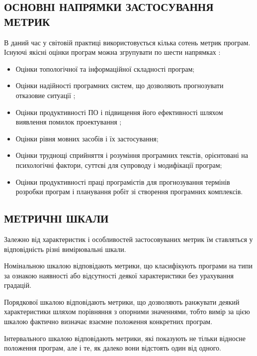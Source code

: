 \subsection{ОСНОВНІ НАПРЯМКИ ЗАСТОСУВАННЯ МЕТРИК}
\label{2section:id4}
В даний час у світовій практиці використовується кілька сотень метрик програм. Існуючі якісні оцінки програм можна згрупувати по шести напрямках :
\begin{itemize}
\item {} 
Оцінки топологічної та інформаційної складності програм;

\item {} 
Оцінки надійності програмних систем, що дозволяють прогнозувати отказовие ситуації ;

\item {} 
Оцінки продуктивності ПО і підвищення його ефективності шляхом виявлення помилок проектування ;

\item {} 
Оцінки рівня мовних засобів і їх застосування;

\item {} 
Оцінки труднощі сприйняття і розуміння програмних текстів, орієнтовані на психологічні фактори, суттєві для супроводу і модифікації програм;

\item {} 
Оцінки продуктивності праці програмістів для прогнозування термінів розробки програм і планування робіт зі створення програмних комплексів.

\end{itemize}


\subsection{МЕТРИЧНІ ШКАЛИ}
\label{2section:id5}
Залежно від характеристик і особливостей застосовуваних метрик їм ставляться у відповідність різні вимірювальні шкали.

Номінальною шкалою відповідають метрики, що класифікують програми на типи за ознакою наявності або відсутності деякої характеристики без урахування градацій.

Порядкової шкалою відповідають метрики, що дозволяють ранжувати деякий характеристики шляхом порівняння з опорними значеннями, тобто вимір за цією шкалою фактично визначає взаємне положення конкретних програм.

Інтервального шкалою відповідають метрики, які показують не тільки відносне положення програм, але і те, як далеко вони відстоять один від одного.

